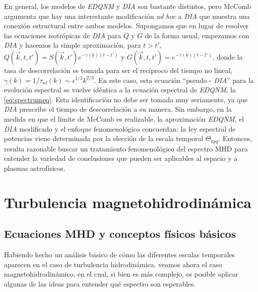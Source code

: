 En general, los modelos de \textit{EDQNM} y \textit{DIA} son bastante
distintos, pero McComb \cite{mccomb_physics_1990} argumenta que hay
una interestante modificación \textit{ad hoc} a \textit{DIA} que
muestra una conexión estructural entre ambos modelos. Supongamos que
en lugar de resolver las ecuaciones isotrópicas de \textit{DIA} para
$Q$ y $G$ de la forma usual, empezamos con \textit{DIA} y hacemos la
simple aproximación, para $t>t'$, $Q(\vec{k}, t, t') = S(\vec{k}, t')
e^{-\gamma(k) (t-t')}$ y $G(\vec{k}, t, t') = e^{-\gamma(k)(t-t')}$,
donde la tasa de descorrelación es tomada para ser el recíproco del
tiempo no lineal, $\gamma(k) = 1/\tau_{nl}(k) \sim \epsilon^{1/3}
k^{2/3}$. En este caso, esta ecuación ``pseudo - \textit{DIA}'' para
la evolución espectral se vuelve idéntica a la ecuación espectral de
\textit{EDQNM}, la \cref{eq:spectrumeq}. Esta identificación no debe
ser tomada muy seriamente, ya que \textit{DIA} prescribe el tiempo de
descorrelación a su manera. Sin embargo, en la medida en que el límite
de McComb es realizable, la aproximación \textit{EDQNM}, el
\textit{DIA} modificado y el enfoque fenomenológico concuerdan: la ley
espectral de potencias viene determinada por la elección de la escala
temporal $\Theta_{kpq}$. Entonces, resulta razonable buscar un
tratamiento fenomenológico del espectro MHD para entender la variedad
de conclusiones que pueden ser aplicables al espacio y a plasmas
astrofísicos.




\section{Turbulencia magnetohidrodinámica}\label{sec:turbulenciaMHD}

\subsection{Ecuaciones MHD y conceptos físicos básicos}

Habiendo hecho un análisis básico de cómo las diferentes escalas
temporales aparecen en el caso de turbulencia hidrodinámica, veamos
ahora el caso magnetohidrodinámico, en el cual, si bien es más
complejo, es posible aplicar algunas de las ideas para entender qué
espectro son esperables.

